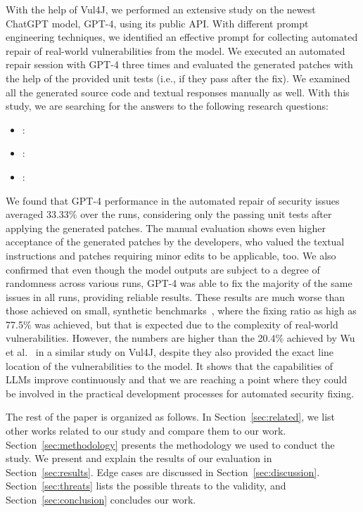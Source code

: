 With the help of Vul4J, we performed an extensive study on the newest ChatGPT model, GPT-4, using its public API.
With different prompt engineering techniques, we identified an effective prompt for collecting automated repair of real-world vulnerabilities from the model.
We executed an automated repair session with GPT-4 three times and evaluated the generated patches with the help of the provided unit tests (i.e., if they pass after the fix).
We examined all the generated source code and textual responses manually as well.
With this study, we are searching for the answers to the following research questions:


\begin{itemize}
	\item {} : \secondthesisrqone
	\item {} : \secondthesisrqtwo
	\item {} : \secondthesisrqthree
\end{itemize}


We found that GPT-4 performance in the automated repair of security issues averaged 33.33\%\xspace over the runs, considering only the passing unit tests after applying the generated patches.
The manual evaluation shows even higher acceptance of the generated patches by the developers, who valued the textual instructions and patches requiring minor edits to be applicable, too.
We also confirmed that even though the model outputs are subject to a degree of randomness across various runs, GPT-4 was able to fix the majority of the same issues in all runs, providing reliable results.
These results are much worse than those achieved on small, synthetic benchmarks~\cite{quix_bugs_abuser_2}, where the fixing ratio as high as 77.5\% was achieved, but that is expected due to the complexity of real-world vulnerabilities.
However, the numbers are higher than the 20.4\% achieved by Wu et al.~\cite{same_as_us_but_too_much_hint} in a similar study on Vul4J, despite they also provided the exact line location of the vulnerabilities to the model.
It shows that the capabilities of LLMs improve continuously and that we are reaching a point where they could be involved in the practical development processes for automated security fixing.

The rest of the paper is organized as follows.
In Section~\ref{sec:related}, we list other works related to our study and compare them to our work.
Section~\ref{sec:methodology} presents the methodology we used to conduct the study.
We present and explain the results of our evaluation in Section~\ref{sec:results}.
Edge cases are discussed in Section~\ref{sec:discussion}.
Section~\ref{sec:threats} lists the possible threats to the validity, and Section~\ref{sec:conclusion} concludes our work.

